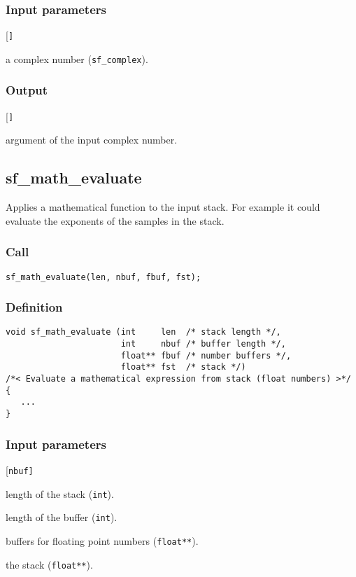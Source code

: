 \subsubsection*{Input parameters}
\begin{desclist}{\tt }{\quad}[\tt ]
   \setlength\itemsep{0pt}
   \item[c] a complex number (\texttt{sf\_complex}).  
\end{desclist}

\subsubsection*{Output}
\begin{desclist}{\tt }{\quad}[\tt ]
   \setlength\itemsep{0pt}
   \item[c] argument of the input complex number.
\end{desclist}




\subsection{{sf\_math\_evaluate}}\label{sec:sf_math_evaluate}
Applies a mathematical function to the input stack. For example it could evaluate the exponents of the samples in the stack.

\subsubsection*{Call}
\begin{verbatim}sf_math_evaluate(len, nbuf, fbuf, fst);\end{verbatim}

\subsubsection*{Definition}
\begin{verbatim}
void sf_math_evaluate (int     len  /* stack length */, 
                       int     nbuf /* buffer length */, 
                       float** fbuf /* number buffers */, 
                       float** fst  /* stack */)
/*< Evaluate a mathematical expression from stack (float numbers) >*/
{
   ...
}
\end{verbatim}

\subsubsection*{Input parameters}
\begin{desclist}{\tt }{\quad}[\tt nbuf]
   \setlength\itemsep{0pt}
   \item[len]  length of the stack (\texttt{int}). 
   \item[nbuf] length of the buffer (\texttt{int}). 
   \item[fbuf] buffers for floating point numbers (\texttt{float**}).  
   \item[fst]  the stack (\texttt{float**}).  
\end{desclist}




